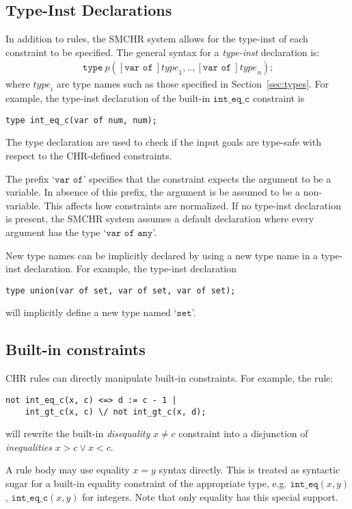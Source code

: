 \documentclass{article}
\begin{document}
\subsection{Type-Inst Declarations}

In addition to rules, the SMCHR system allows for the type-inst of each
constraint to be specified.
The general syntax for a \emph{type-inst} declaration is:
\begin{align*}
\texttt{type}~p([\texttt{var of}~]\mathit{type}_1, ..,
    [\texttt{var of}~]\mathit{type}_n)\texttt{;}
\end{align*}
where $\mathit{type}_i$ are type names such as those specified in
Section~\ref{sec:types}.
For example, the type-inst declaration of the built-in $\mathtt{int\_eq\_c}$
constraint is
\begin{verbatim}
type int_eq_c(var of num, num);
\end{verbatim}
The type declaration are used to check if the input goals are type-safe
with respect to the CHR-defined constraints.

The prefix `$\texttt{var of}$' specifies that the constraint expects the
argument to be a variable.
In absence of this prefix, the argument is be assumed to be a non-variable.
This affects how constraints are normalized.
If no type-inst declaration is present, the SMCHR system assumes a
default declaration where every argument has the type
`$\texttt{var of any}$'.

New type names can be implicitly declared by using a new type name in a
type-inst declaration.
For example, the type-inst declaration
\begin{verbatim}
type union(var of set, var of set, var of set);
\end{verbatim}
will implicitly define a new type named `$\mathtt{set}$'.

\subsection{Built-in constraints}

CHR rules can directly manipulate built-in constraints.
For example, the rule:
\begin{verbatim}
not int_eq_c(x, c) <=> d := c - 1 |
    int_gt_c(x, c) \/ not int_gt_c(x, d);
\end{verbatim}
will rewrite the built-in \emph{disequality} $x \neq c$ constraint
into a disjunction of \emph{inequalities} $x > c \vee x < c$.

A rule body may use equality $x = y$ syntax directly.
This is treated as syntactic sugar for a built-in
equality constraint of the appropriate type, e.g.
$\mathtt{int\_eq}(x, y)$, $\mathtt{int\_eq\_c}(x, y)$ for
integers.
Note that only equality has this special support.
\end{document}
